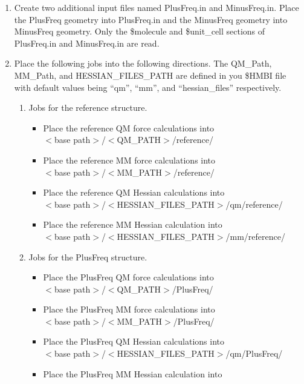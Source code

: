 \documentclass[11pt,letterpaper]{article}
\begin{document}
\begin{spacing}{1.0}
\begin{enumerate}
    \item Create two additional input files named PlusFreq.in and MinusFreq.in. Place the PlusFreq geometry into PlusFreq.in
      and the MinusFreq geometry into MinusFreq geometry. Only the \$molecule and \$unit\_cell sections of PlusFreq.in and MinusFreq.in are
      read.
    \item Place the following jobs into the following directions. The QM\_Path, MM\_Path, and 
      HESSIAN\_FILES\_PATH are defined in you \$HMBI file with default values being ``qm'', ``mm'', and ``hessian\_files''
      respectively.
      \begin{enumerate}
        \item Jobs for the reference structure.
        \begin{itemize}
          \item Place the reference QM force calculations into \\
            $<$base path$>$/$<$QM\_PATH$>$/reference/ 
          \item Place the reference MM force calculations into \\
            $<$base path$>$/$<$MM\_PATH$>$/reference/   
          \item Place the reference QM Hessian calculations into \\
            $<$base path$>$/$<$HESSIAN\_FILES\_PATH$>$/qm/reference/  
          \item Place the reference MM Hessian calculation into \\
            $<$base path$>$/$<$HESSIAN\_FILES\_PATH$>$/mm/reference/  
        \end{itemize}
        \item Jobs for the PlusFreq structure.
        \begin{itemize}
          \item Place the PlusFreq QM force calculations into \\
            $<$base path$>$/$<$QM\_PATH$>$/PlusFreq/ 
          \item Place the PlusFreq MM force calculations into \\
            $<$base path$>$/$<$MM\_PATH$>$/PlusFreq/   
          \item Place the PlusFreq QM Hessian calculations into \\
            $<$base path$>$/$<$HESSIAN\_FILES\_PATH$>$/qm/PlusFreq/  
          \item Place the PlusFreq MM Hessian calculation into \\

\end{itemize}
\end{enumerate}
\end{enumerate}
\end{spacing}
\end{document}
